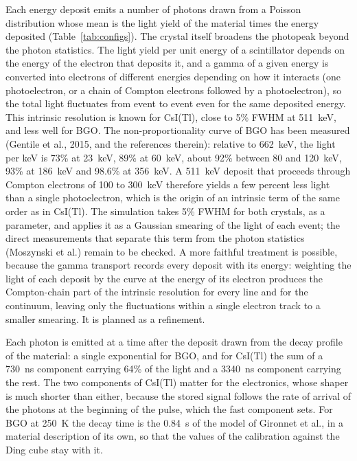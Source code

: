 \documentclass[11pt]{article}
\newcommand{\us}{\textmu s\xspace}
\newcommand{\csitl}{CsI(Tl)\xspace}
\begin{document}
Each energy deposit emits a number of photons drawn from a Poisson
distribution whose mean is the light yield of the material times the energy
deposited (Table~\ref{tab:configs}). The crystal itself broadens the
photopeak beyond the photon statistics. The light yield per unit energy of a
scintillator depends on the energy of the electron that deposits it, and a
gamma of a given energy is converted into electrons of different energies
depending on how it interacts (one photoelectron, or a chain of Compton
electrons followed by a photoelectron), so the total light fluctuates from
event to event even for the same deposited energy. This intrinsic resolution
is known for \csitl, close to 5\% FWHM at 511~keV, and less well for BGO. The
non-proportionality curve of BGO has been measured (Gentile et al., 2015,
and the references therein): relative to 662~keV, the light per keV is 73\%
at 23~keV, 89\% at 60~keV, about 92\% between 80 and 120~keV, 93\% at
186~keV and 98.6\% at 356~keV. A 511~keV deposit that proceeds through
Compton electrons of 100 to 300~keV therefore yields a few percent less light
than a single photoelectron, which is the origin of an intrinsic term of the
same order as in \csitl. The simulation takes 5\% FWHM for both crystals,
as a parameter, and applies it as a Gaussian smearing of the light of each
event; the direct measurements that separate this term from the photon
statistics (Moszynski et al.) remain to be checked. A more faithful
treatment is possible, because the gamma transport records every deposit
with its energy: weighting the light of each deposit by the curve at the
energy of its electron produces the Compton-chain part of the intrinsic
resolution for every line and for the continuum, leaving only the
fluctuations within a single electron track to a smaller smearing. It is
planned as a refinement.

Each photon is emitted at a time after the deposit drawn from the decay
profile of the material: a single exponential for BGO, and for \csitl the
sum of a 730~ns component carrying 64\% of the light and a 3340~ns component
carrying the rest. The two components of \csitl matter for the electronics,
whose shaper is much shorter than either, because the stored signal follows
the rate of arrival of the photons at the beginning of the pulse, which the
fast component sets. For BGO at 250~K the decay time is the 0.84~\us of the model
of Gironnet et al., in a material description of its own, so that the
values of the calibration against the Ding cube stay with it.
\end{document}
